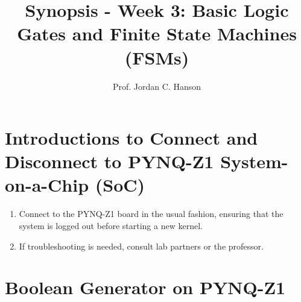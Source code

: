 \documentclass{article}
\begin{document}
\title{Synopsis - Week 3: Basic Logic Gates and Finite State Machines (FSMs)}
\author{Prof. Jordan C. Hanson}

\maketitle

\section{Introductions to Connect and Disconnect to PYNQ-Z1 System-on-a-Chip (SoC)}

\begin{enumerate}
\item Connect to the PYNQ-Z1 board in the usual fashion, ensuring that the system is logged out before starting a new kernel.
\item If troubleshooting is needed, consult lab partners or the professor.
\end{enumerate}

\section{Boolean Generator on PYNQ-Z1}
\end{document}
